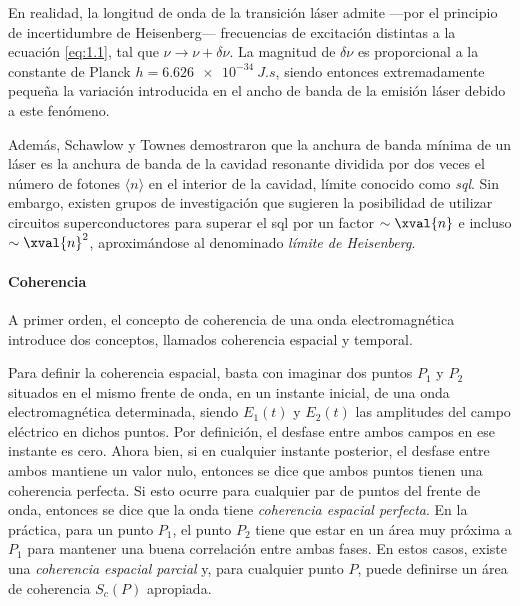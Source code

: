 En realidad, la longitud de onda de la transición láser admite ---por el principio de incertidumbre de Heisenberg--- frecuencias de excitación distintas a la ecuación \eqref{eq:1.1}, tal que $\nu\rightarrow\nu + \delta\nu$. La magnitud de $\delta\nu$ es proporcional a la constante de Planck $h = \qty{6,626e-34}{J.s}$, siendo entonces extremadamente pequeña la variación introducida en el ancho de banda de la emisión láser debido a este fenómeno. 

Además, Schawlow y Townes demostraron que la anchura de banda mínima de un láser es la anchura de banda de la cavidad resonante dividida por dos veces el número de fotones $\langle n\rangle$ en el interior de la cavidad, límite conocido como \emph{\acrfull{sql}}. Sin embargo, existen grupos de investigación\autocite{Liu2021} que sugieren la posibilidad de utilizar circuitos superconductores para superar el \acrshort{sql} por un factor $\sim \xval{n}$ e incluso $\sim \xval{n}^{2}$, aproximándose al denominado \emph{límite de Heisenberg}.

\paragraph{Coherencia}
A primer orden, el concepto de coherencia de una onda electromagnética introduce dos conceptos, llamados coherencia espacial y temporal\autocite{Svelto2010}.

Para definir la coherencia espacial, basta con imaginar dos puntos $P_1$ y $P_2$ situados en el mismo frente de onda, en un instante inicial, de una onda electromagnética determinada, siendo $E_1(t)$ y $E_2(t)$ las amplitudes del campo eléctrico en dichos puntos. Por definición, el desfase entre ambos campos en ese instante es cero. Ahora bien, si en cualquier instante posterior, el desfase entre ambos mantiene un valor nulo, entonces se dice que ambos puntos tienen una coherencia perfecta. Si esto ocurre para cualquier par de puntos del frente de onda, entonces se dice que la onda tiene \emph{coherencia espacial perfecta}. En la práctica, para un punto $P_1$, el punto $P_2$ tiene que estar en un área muy próxima a $P_1$ para mantener una buena correlación entre ambas fases. En estos casos, existe una \emph{coherencia espacial parcial} y, para cualquier punto $P$, puede definirse un área de coherencia $S_{c}(P)$ apropiada.

